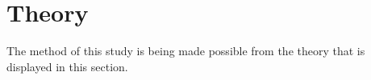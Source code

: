 \section{Theory}

The method of this study is being made possible from the theory that is displayed in this section. 










